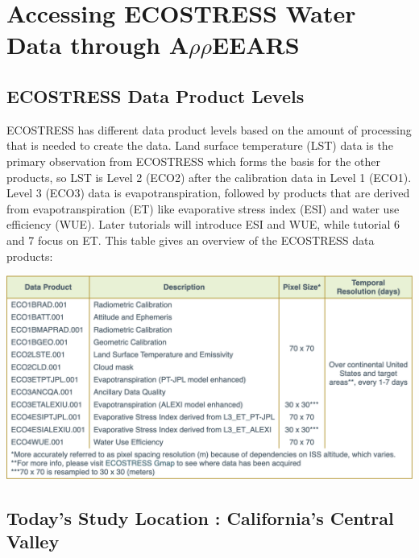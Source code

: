 \documentclass[oneside,a4paper,11pt,explicit]{book}
\begin{document}
\section{Accessing ECOSTRESS Water Data through A$\rho\rho$EEARS}

\subsection{ECOSTRESS Data Product Levels}

ECOSTRESS has different data product levels based on the amount of processing that is needed to create the data. Land surface temperature (LST) data is the primary observation from ECOSTRESS which forms the basis for the other products, so LST is Level 2 (ECO2) after the calibration data in Level 1 (ECO1). Level 3 (ECO3) data is evapotranspiration, followed by products that are derived from evapotranspiration (ET) like evaporative stress index (ESI) and water use efficiency (WUE). Later tutorials will introduce ESI and WUE, while tutorial 6 and 7 focus on ET. This table gives an overview of the ECOSTRESS data products: 

\vspace{.5em}

\centerline{\includegraphics[width=.75\textwidth]{ECOSTRESS_DataProducts.png}}

\vspace{.5em}

\subsection{Today's Study Location : California's Central Valley}
\end{document}
